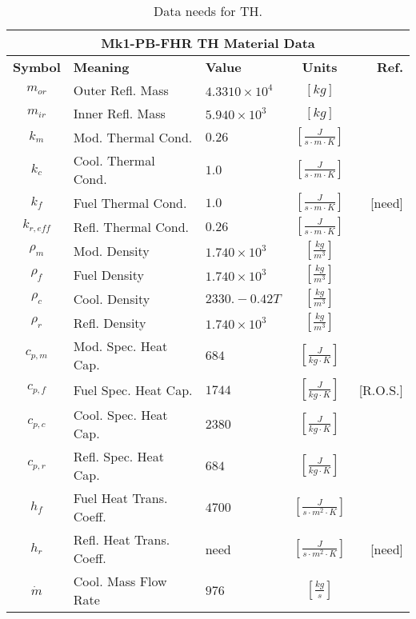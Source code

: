 
\begin{table}[ht!]
\centering
\begin{tabularx}{\textwidth}{|c|l|X|c|r|}
\multicolumn{5}{c}{\textbf{Mk1-PB-FHR TH Material Data}}\\
\hline
\textbf{Symbol} & \textbf{Meaning} & \textbf{Value} & \textbf{Units} & \textbf{Ref.} \\
\hline
$m_{or}$ & Outer Refl. Mass & $4.3310\times 10^4$ & $[kg]$ & \cite{andreades_technical_2014} \\
$m_{ir}$ & Inner Refl. Mass & $5.940\times 10^3$ & $[kg]$ & \cite{andreades_technical_2014} \\
$k_m$ & Mod. Thermal Cond. & $0.26$ & $[\frac{J}{s\cdot m\cdot K}]$ & \cite{andreades_technical_2014} \\
$k_c$ & Cool. Thermal Cond. & $1.0$ & $[\frac{J}{s\cdot m\cdot K}]$ & \cite{gierszewski_property_1980,andreades_technical_2014} \\
$k_f$ & Fuel Thermal Cond. & $1.0$ & $[\frac{J}{s\cdot m\cdot K}]$ & [need] \\
$k_{r,eff}$ & Refl. Thermal Cond. & $0.26$ & $[\frac{J}{s\cdot m\cdot K}]$ & \cite{andreades_technical_2014} \\
$\rho_m$ & Mod. Density & $1.740\times10^3$ & $[\frac{kg}{m^3}]$ & \cite{andreades_technical_2014} \\
$\rho_f$ & Fuel Density & $1.740\times10^3$ & $[\frac{kg}{m^3}]$ & \cite{andreades_technical_2014} \\
$\rho_c$ & Cool. Density & $2330.-0.42T$& $[\frac{kg}{m^3}]$ & \cite{gierszewski_property_1980}\\
$\rho_r$ & Refl. Density & $1.740\times10^3$ & $[\frac{kg}{m^3}]$ & \cite{andreades_technical_2014} \\
$c_{p,m}$ & Mod. Spec. Heat Cap. & $684$ & $[\frac{J}{kg\cdot K}]$ & \cite{snead_thermal_1995} \\
$c_{p,f}$ & Fuel Spec. Heat Cap. & $1744$ & $[\frac{J}{kg\cdot K}]$ & [R.O.S.] \\
$c_{p,c}$ & Cool. Spec. Heat Cap. & $2380$ & $[\frac{J}{kg\cdot K}]$ & \cite{gierszewski_property_1980}\\
$c_{p,r}$ & Refl. Spec. Heat Cap. & $684$ & $[\frac{J}{kg\cdot K}]$ & \cite{snead_thermal_1995} \\
$h_f$ & Fuel Heat Trans. Coeff. & $4700$ & $[\frac{J}{s \cdot m^2\cdot K}]$ & \cite{andreades_technical_2014} \\
$h_r$ & Refl. Heat Trans. Coeff. & need & $[\frac{J}{s \cdot m^2\cdot K}]$ & [need] \\
$\dot{m}$ & Cool. Mass Flow Rate & $976$ & $[\frac{kg}{s}]$ & \cite{andreades_technical_2014} \\
\hline
\end{tabularx}
\caption{Data needs for TH.}
\label{tab:th_mat_data}
\end{table}

